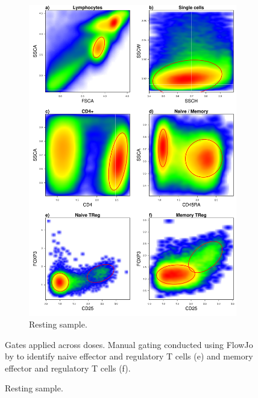 \hspace{-2cm}
\begin{figure}[h]
\centering
\begin{subfigure}[b]{.4\textwidth}
\includegraphics[scale=.25]{IL2/figures/manual-gating-CB00165D_0U_2012-11-29.pdf}
\caption{Resting sample.}
\end{subfigure}
{Gates applied across doses.}
{
Manual gating conducted using FlowJo by  to identify
naive effector and regulatory T cells (e)
and memory effector and regulatory T cells (f).
}
\end{figure}


